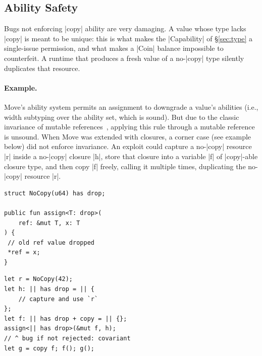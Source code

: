\subsection{Ability Safety}
\label{sec:ability}

Bugs not enforcing |copy| ability are very damaging.
A value whose type lacks |copy| is meant to be unique: this is what makes the |Capability| of \S\ref{sec:type} a single-issue permission, and what makes a |Coin| balance impossible to counterfeit.
A runtime that produces a fresh value of a no-|copy| type silently duplicates that resource.

\paragraph{Example.}
Move's ability system permits an assignment to downgrade a value's abilities (i.e., width subtyping over the ability set, which is sound).
But due to the classic invariance of mutable references~\cite{pierce2002tapl}, applying this rule through a mutable reference is unsound.
When Move was extended with closures, a corner case (see example below) did not enforce invariance.
An exploit could capture a no-|copy| resource |r| inside a no-|copy| closure |h|, store that closure into a variable |f| of |copy|-able closure type, and then copy |f| freely, calling it multiple times, duplicating the no-|copy| resource |r|.

\noindent
\begin{minipage}[t]{0.46\linewidth}
\begin{lstlisting}[language=Move,style=MoveStyle,basicstyle=\relsize{-2}\ttfamily,keywordstyle=\color{blue},frame=single,frameround=tttt,framesep=4pt,rulecolor=\color{gray!60},backgroundcolor=\color{gray!4}]
struct NoCopy(u64) has drop;

public fun assign<T: drop>(
    ref: &mut T, x: T
) {
 // old ref value dropped
 *ref = x;
}
\end{lstlisting}
\end{minipage}\hfill
\begin{minipage}[t]{0.50\linewidth}
\begin{lstlisting}[language=Move,style=MoveStyle,basicstyle=\relsize{-2}\ttfamily,keywordstyle=\color{blue},frame=single,frameround=tttt,framesep=4pt,rulecolor=\color{gray!60},backgroundcolor=\color{gray!4}]
let r = NoCopy(42);
let h: || has drop = || {
    // capture and use `r`
};
let f: || has drop + copy = || {};
assign<|| has drop>(&mut f, h);
// ^ bug if not rejected: covariant
let g = copy f; f(); g();
\end{lstlisting}
\end{minipage}

